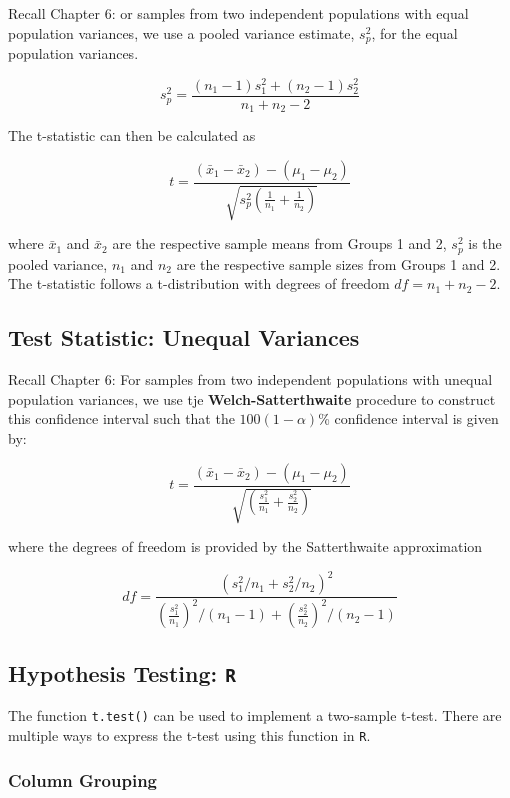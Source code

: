 \documentclass[
  letterpaper,
  DIV=11,
  numbers=noendperiod]{scrartcl}
\begin{document}
Recall Chapter 6: or samples from two independent populations with equal
population variances, we use a pooled variance estimate, \(s_p^2\), for
the equal population variances.

\[
s_p^2 = \frac{(n_1-1)s_1^2 + (n_2-1)s_2^2}{n_1 + n_2 - 2}
\]

The t-statistic can then be calculated as

\[
t = \frac{(\bar{x}_1-\bar{x}_2) - (\mu_1-\mu_2)}{\sqrt{s_p^2\left(\frac{1}{n_1} + \frac{1}{n_2}\right)}}
\]

where \(\bar{x}_1\) and \(\bar{x}_2\) are the respective sample means
from Groups 1 and 2, \(s_p^2\) is the pooled variance, \(n_1\) and
\(n_2\) are the respective sample sizes from Groups 1 and 2. The
t-statistic follows a t-distribution with degrees of freedom
\(df=n_1 + n_2 - 2\).

\subsection{Test Statistic: Unequal
Variances}\label{test-statistic-unequal-variances}

Recall Chapter 6: For samples from two independent populations with
unequal population variances, we use tje \textbf{Welch-Satterthwaite}
procedure to construct this confidence interval such that the
\(100(1-\alpha)\)\% confidence interval is given by:

\[
t=\frac{(\bar{x}_1-\bar{x}_2) - (\mu_1-\mu_2)}{\sqrt{\left(\frac{s_1^2}{n_1} + \frac{s_2^2}{n_2}\right)}}
\]

where the degrees of freedom is provided by the Satterthwaite
approximation

\[
df = \frac{(s_1^2/n_1 + s_2^2/n_2)^2}{\left(\frac{s_1^2}{n_1}\right)^2/(n_1-1) + \left(\frac{s_2^2}{n_2}\right)^2/(n_2-1)}
\]

\subsection{\texorpdfstring{Hypothesis Testing:
\texttt{R}}{Hypothesis Testing: R}}\label{hypothesis-testing-r}

The function \texttt{t.test()} can be used to implement a two-sample
t-test. There are multiple ways to express the t-test using this
function in \texttt{R}.

\subsubsection{Column Grouping}
\end{document}
